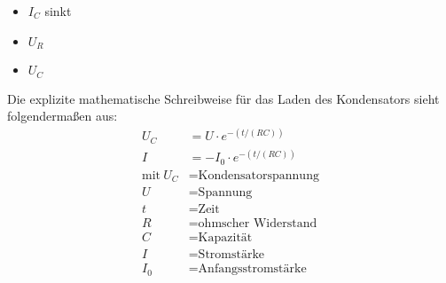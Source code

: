 \begin{itemize}
\item $I_C$ sinkt
\end{itemize}
\begin{itemize}
\item $U_R$
\end{itemize}
\begin{itemize}
\item $U_C$
\end{itemize}
Die explizite mathematische Schreibweise für das Laden des Kondensators sieht folgendermaßen aus:
\begin{align*}
U_C &= U \cdot e^{-(t/(RC))}\\
I &= -I_0 \cdot e^{-(t/(RC))}\\
\text{mit} \ U_C &= \text{Kondensatorspannung}\\
U &= \text{Spannung}\\
t &= \text{Zeit}\\
R &= \text{ohmscher Widerstand}\\
C &= \text{Kapazität}\\
I &= \text{Stromstärke}\\
I_0 &= \text{Anfangsstromstärke}\\
\end{align*}

